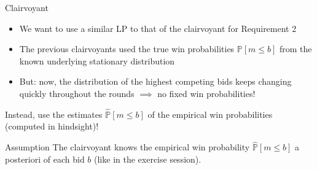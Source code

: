 \begin{frame}{Clairvoyant}
    \begin{itemize}
        \item We want to use a similar LP to that of the clairvoyant for Requirement 2
        \item The previous clairvoyants used the true win probabilities $\mathbb{P}\left[ m \le b \right]$ from the known underlying stationary distribution 
        \item But: now, the distribution of the highest competing bids keeps changing quickly throughout the rounds $\implies$ no fixed win probabilities!
    \end{itemize}

Instead, use the estimates $\hat{\mathbb{P}}\left[ m \le b \right]$ of the empirical win probabilities (computed in hindsight)!
        
    \begin{block}{Assumption} 
        The clairvoyant knows the empirical win probability $\hat{\mathbb{P}}\left[ m \le b \right]$ a posteriori of each bid $b$ (like in the exercise session).
    \end{block}
\end{frame}

